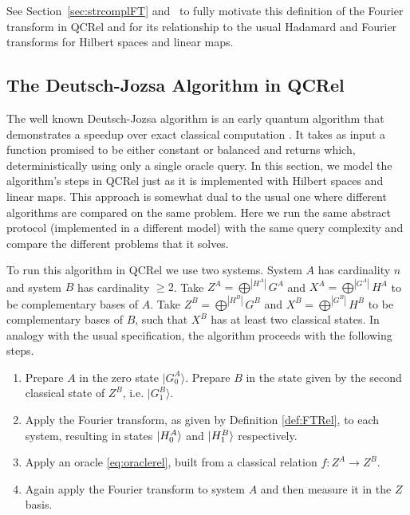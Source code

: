 See Section~\ref{sec:strcomplFT} and~\cite{gogioso2015fourier} to fully motivate this definition of the Fourier transform in QCRel and for its relationship to the usual Hadamard and Fourier transforms for Hilbert spaces and linear maps.

\subsection{The Deutsch-Jozsa Algorithm in QCRel}

The well known Deutsch-Jozsa algorithm is an early quantum algorithm that demonstrates a speedup over exact classical computation \cite{DJAlg1992}. It takes as input a function promised to be either constant or balanced and returns which, deterministically using only a single oracle query. In this section, we model the algorithm's steps in QCRel just as it is implemented with Hilbert spaces and linear maps. This approach is somewhat dual to the usual one where different algorithms are compared on the same problem. Here we run the same abstract protocol (implemented in a different model) with the same query complexity and compare the different problems that it solves.

To run this algorithm in QCRel we use two systems.  System $A$ has cardinality $n$ and system $B$ has cardinality $\ge 2$. Take $Z^A=\bigoplus^{|H^{A}|}G^A$ and $X^A=\bigoplus^{|G^{A}|}H^A$ to be complementary bases of $A$. Take $Z^B=\bigoplus^{|H^{B}|}G^B$ and $X^B=\bigoplus^{|G^{B}|}H^B$ to be complementary bases of $B$, such that $X^B$ has at least two classical states. In analogy with the usual specification, the algorithm proceeds with the following steps.
\begin{enumerate}
\item Prepare $A$ in the zero state $|G^{A}_0\rangle$. Prepare $B$ in the state given by the second classical state of $Z^B$, i.e. $|G^B_1\rangle$.

\item Apply the Fourier transform, as given by Definition \ref{def:FTRel}, to each system, resulting in states $| H_0^A \rangle$ and $| H_1^B \rangle$ respectively.

\item Apply an oracle \eqref{eq:oraclerel}, built from a classical relation $f:Z^A\to Z^B$.

\item Again apply the Fourier transform to system $A$ and then measure it in the $Z$ basis.
\end{enumerate}

